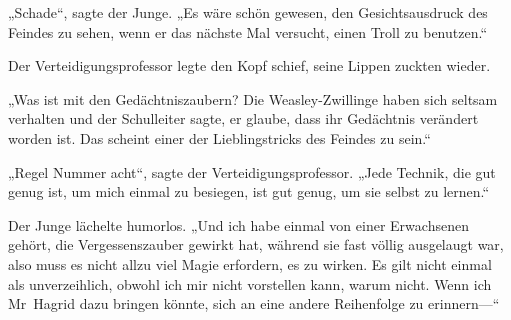 „Schade“, sagte der Junge. „Es wäre schön gewesen, den Gesichtsausdruck des Feindes zu sehen, wenn er das nächste Mal versucht, einen Troll zu benutzen.“

Der Verteidigungsprofessor legte den Kopf schief, seine Lippen zuckten wieder.

„Was ist mit den Gedächtniszaubern? Die Weasley-Zwillinge haben sich seltsam verhalten und der Schulleiter sagte, er glaube, dass ihr Gedächtnis verändert worden ist. Das scheint einer der Lieblingstricks des Feindes zu sein.“

„Regel Nummer acht“, sagte der Verteidigungsprofessor. „Jede Technik, die gut genug ist, um mich einmal zu besiegen, ist gut genug, um sie selbst zu lernen.“

Der Junge lächelte humorlos.
„Und ich habe einmal von einer Erwachsenen gehört, die Vergessenszauber gewirkt hat, während sie fast völlig ausgelaugt war, also muss es nicht allzu viel Magie erfordern, es zu wirken. Es gilt nicht einmal als unverzeihlich, obwohl ich mir nicht vorstellen kann, warum nicht. Wenn ich Mr~Hagrid dazu bringen könnte, sich an eine andere Reihenfolge zu erinnern—“

